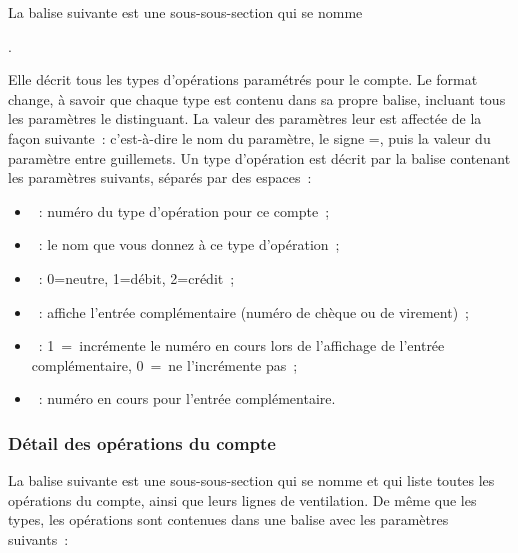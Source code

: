 La balise suivante est une sous-sous-section qui se nomme 

. 

Elle décrit tous les types 
d'opérations paramétrés pour le compte. Le format change, à savoir que chaque 
type est contenu dans sa propre balise, incluant tous les paramètres le 
distinguant. La valeur des paramètres leur est affectée de la façon suivante~: 
 c'est-à-dire le nom du paramètre, le signe =, puis la 
valeur du paramètre entre guillemets. Un type d'opération est décrit par la
balise  contenant les paramètres suivants, séparés par des espaces~:

\begin{itemize}

\item {}~: numéro du type d'opération pour ce compte~;

\item {}~: le nom que vous donnez à ce type d'opération~;

\item {}~: 0=neutre, 1=débit, 2=crédit~;

\item {}~: affiche l'entrée complémentaire (numéro de 
chèque ou de virement)~;

\item {}~: 1~=~incrémente le numéro en cours
lors de l'affichage de l'entrée complémentaire, 0~=~ne l'incrémente pas~;

\item {}~: numéro en cours pour l'entrée complémentaire.

\end{itemize}

\subsubsection{Détail des opérations du compte}

La balise suivante est une sous-sous-section qui se nomme
 et qui liste toutes les 
opérations du compte, ainsi que leurs lignes de ventilation. De même que les 
types, les opérations sont contenues dans une balise  avec les 
paramètres suivants~:

